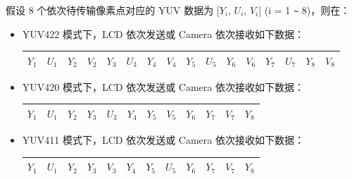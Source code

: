 \documentclass[main\_\_CN.tex]{subfiles}
\begin{document}
假设 8 个依次待传输像素点对应的 YUV 数据为 [$Y_i$, $U_i$, $V_i$] (i = 1 \verb+~+ 8)，则在：
\begin{itemize}
    \item YUV422 模式下，LCD 依次发送或 Camera 依次接收如下数据：
        \begin{table}[H]
            \centering
            \begin{tabular}{|c|c|c|c|c|c|c|c|c|c|c|c|c|c|c|c|}
            \hline
            $Y_1$ & $U_1$ & $Y_2$ & $V_2$ & $Y_3$ & $U_3$ & $Y_4$ & $V_4$ & $Y_5$ & $U_5$ & $Y_6$ & $V_6$ & $Y_7$ & $U_7$ & $Y_8$ & $V_8$ \\ \hline
            \end{tabular}
        \end{table}
    \item YUV420 模式下，LCD 依次发送或 Camera 依次接收如下数据：
        \begin{table}[H]
            \centering
            \begin{tabular}{|c|c|c|c|c|c|c|c|c|c|c|c|}
            \hline
            $Y_1$ & $U_1$ & $Y_2$ & $Y_3$ & $U_3$ & $Y_4$ & $Y_5$ & $V_5$ & $Y_6$ & $Y_7$ & $V_7$ & $Y_8$ \\ \hline
            \end{tabular}
        \end{table}
    \item YUV411 模式下，LCD 依次发送或 Camera 依次接收如下数据：
        \begin{table}[H]
            \centering
            \begin{tabular}{|c|c|c|c|c|c|c|c|c|c|c|c|}
            \hline
            $Y_1$ & $U_1$ & $Y_2$ & $Y_3$ & $V_3$ & $Y_4$ & $Y_5$ & $U_5$ & $Y_6$ & $Y_7$ & $V_7$ & $Y_8$ \\ \hline
            \end{tabular}
        \end{table}
\end{itemize}
\end{document}
